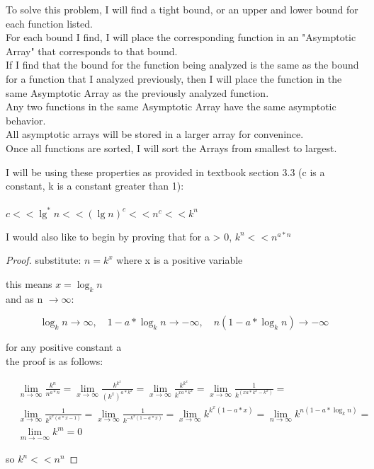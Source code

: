 \documentclass[11pt,fleqn]{article}
\theoremstyle{definition}
\theoremstyle{remark}
\begin{document}
To solve this problem, I will find a tight bound, or an 
upper and lower bound for each function listed.\\

For each bound I find, I will place the corresponding function
in an "Asymptotic Array" that corresponds to that bound.\\

If I find that the bound for the function being analyzed
is the same as the bound for a function
that I analyzed previously, then I will 
place the function in the same Asymptotic Array 
as the previously analyzed function.\\

Any two functions in the same Asymptotic Array have the same 
asymptotic behavior.\\

All asymptotic arrays will be stored in a larger array for convenince.\\

Once all functions are sorted, I will sort the Arrays from smallest
to largest.

I will be using these properties as provided in textbook section 3.3
(c is a constant, k is a constant greater than 1):\\\\
$c << \lg^*n << ({\lg n})^c << n^{c} << k^{n}$

I would also like to begin by proving that for a > 0, $k^{n} << n^{a*n}$

\begin{proof}
    substitute: $n = k^x$ where x is a positive variable

    this means $x = \log_k n$ \\

    and as n $\to \infty$: 
    
    \noindent \[
    \log_k n \to \infty,  
    \quad 1 - a*\log_k n \to -\infty, 
    \quad n(1 - a*\log_k n) \to -\infty
    \]

    for any positive constant a\\

    the proof is as follows:

    \begin{align*}
        &\lim_{n \to \infty} \frac{k^{n}}{n^{a*n}} = 
        \lim_{x \to \infty} \frac{k^{k^{x}}}{{(k^x)}^{a*k^{x}}} = 
        \lim_{x \to \infty} \frac{k^{k^{x}}}{k^{x{a*k^{x}}}} = 
        \lim_{x \to \infty} \frac{1}{k^{({x{a*k^{x}}} - {k^x})}} = \\
        &\lim_{x \to \infty} \frac{1}{k^{{k^{x}(a*{x} - 1)}}} = 
        \lim_{x \to \infty} \frac{1}{k^{{-k^{x}(1 - a*{x})}}} = 
        \lim_{x \to \infty} {k^{{k^{x}(1 - a*{x})}}} = 
        \lim_{n \to \infty} {k^{{n(1 - a*\log_k n)}}} = \\
        &\lim_{m \to -\infty} {k^{m}} = 0
    \end{align*} 

    so $k^n << n^n$
\end{proof}
\end{document}
